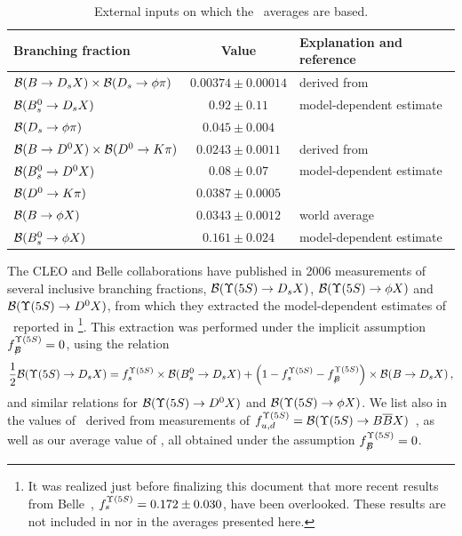 \begin{table}
\caption{External inputs on which the \fsfive\ averages are based.}
\begin{center}
\begin{tabular}{lcl}
\hline
Branching fraction   & Value     & Explanation and reference \\
\hline
${\cal B}(B\to D_s X)\times {\cal B}(D_s \to \phi\pi)$ & 
$0.00374\pm 0.00014$ & derived from~\cite{PDG_2012} \\
${\cal B}(B^0_s \to D_s X)$ & 
$0.92\pm0.11$ & model-dependent estimate~\cite{Artuso:2005xw} \\
${\cal B}(D_s \to \phi\pi)$ & 
$0.045\pm0.004$ & \cite{PDG_2012} \\
${\cal B}(B\to D^0 X)\times {\cal B}(D^0 \to K\pi)$ & 
$0.0243\pm0.0011$ & derived from~\cite{PDG_2012} \\
${\cal B}(B^0_s \to D^0 X)$ & 
$0.08\pm0.07$ & model-dependent estimate~\cite{Drutskoy:2006fg,Artuso:2005xw} \\
${\cal B}(D^0 \to K\pi)$ & 
$0.0387\pm0.0005$ & \cite{PDG_2012} \\
${\cal B}(B \to \phi X)$ & 
$0.0343\pm0.0012$ & world average~\cite{PDG_2012,Huang:2006em_mod} \\
${\cal B}(B^0_s \to \phi X)$ &
$0.161\pm0.024$ & model-dependent estimate~\cite{Huang:2006em_mod} \\
\hline
\end{tabular}
\end{center}
\end{table}

The CLEO and Belle collaborations have published in 2006
measurements of several inclusive \Upsfive branching fractions, 
${\cal B}(\Upsilon(5S)\to D_s X)$, 
${\cal B}(\Upsilon(5S)\to \phi X)$ and 
${\cal B}(\Upsilon(5S)\to D^0 X)$, %
from which they extracted the
model-dependent estimates of \fsfive\
reported in \footnote{%
  \label{foot:life_mix:Esen:2012yz_mod}
  It was realized just before finalizing this document that
  more recent results from Belle~\cite{Esen:2012yz_mod}, 
  $f^{\Upsilon(5S)}_{s} = 0.172 \pm 0.030$, have been overlooked. These results are 
  not included in \Table{fsFiveS} nor in the averages presented here. 
}. %
This extraction was performed 
under the implicit assumption  
$f^{\Upsilon(5S)}_{B\!\!\!\!/}=0$, using the relation 
\begin{equation}
\frac12{\cal B}(\Upsfive\to D_s X)=\fsfive\times{\cal B}(B_s^0\to D_s X) + 
\left(1-\fsfive-\fnBfive\right)\times{\cal B}(B\to D_s X) \,,
\labe{Ds_correct}
\end{equation}
and similar relations for
${\cal B}(\Upsilon(5S)\to D^0 X)$ and ${\cal B}(\Upsilon(5S)\to \phi X)$.
We list also in  
the values of \fsfive\ derived from measurements of
$\fudfive={\cal B}(\Upsfive\to B\bar BX)$~\cite{Huang:2006em_mod,Drutskoy:2010an}, as well as our average value of  \fsfive,
all obtained under the assumption $f^{\Upsilon(5S)}_{B\!\!\!\!/}=0$.

